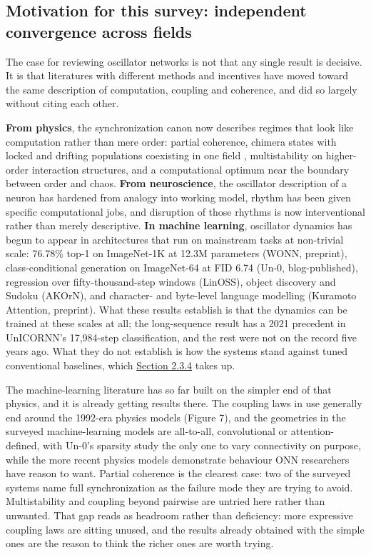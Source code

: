 \documentclass[10pt]{article}
\begin{document}
\subsection{Motivation for this survey: independent convergence across
fields}\label{sec-1-4}

The case for reviewing oscillator networks is not that any single result
is decisive. It is that literatures with different methods and
incentives have moved toward the same description of computation,
coupling and coherence, and did so largely without citing each other.

\textbf{From physics}, the synchronization canon now describes regimes
that look like computation rather than mere order: partial coherence,
chimera states with locked and drifting populations coexisting in one
field \citep{abrams2004}, multistability on higher-order interaction
structures, and a computational optimum near the boundary between order
and chaos. \textbf{From neuroscience}, the oscillator description of a
neuron has hardened from analogy into working model, rhythm has been
given specific computational jobs, and disruption of those rhythms is
now interventional rather than merely descriptive. \textbf{In machine
learning}, oscillator dynamics has begun to appear in architectures that
run on mainstream tasks at non-trivial scale: 76.78\% top-1 on
ImageNet-1K at 12.3M parameters (WONN, preprint), class-conditional
generation on ImageNet-64 at FID 6.74 (Un-0, blog-published), regression
over fifty-thousand-step windows (LinOSS), object discovery and Sudoku
(AKOrN), and character- and byte-level language modelling (Kuramoto
Attention, preprint). What these results establish is that the dynamics
can be trained at these scales at all; the long-sequence result has a
2021 precedent in UnICORNN's 17,984-step classification, and the rest
were not on the record five years ago. What they do not establish is how
the systems stand against tuned conventional baselines, which
\hyperref[sec-2-3-4]{Section 2.3.4} takes up.

The machine-learning literature has so far built on the simpler end of
that physics, and it is already getting results there. The coupling laws
in use generally end around the 1992-era physics models (Figure 7), and
the geometries in the surveyed machine-learning models are all-to-all,
convolutional or attention-defined, with Un-0's sparsity study the only
one to vary connectivity on purpose, while the more recent physics
models demonstrate behaviour ONN researchers have reason to want.
Partial coherence is the clearest case: two of the surveyed systems name
full synchronization as the failure mode they are trying to avoid.
Multistability and coupling beyond pairwise are untried here rather than
unwanted. That gap reads as headroom rather than deficiency: more
expressive coupling laws are sitting unused, and the results already
obtained with the simple ones are the reason to think the richer ones
are worth trying.
\end{document}
